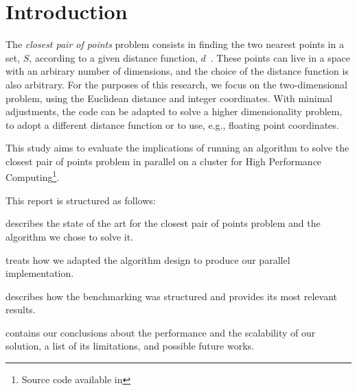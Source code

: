 \section{Introduction}
\label{sec:introduction}

The \textit{closest pair of points} problem consists
in finding the two nearest points in a set, $S$, according to a given distance function, $d$~\cite{closest_pair_definition}.
These points can live in a space with an arbirary number of dimensions,
and the choice of the distance function is also arbitrary.
For the purposes of this research, we focus on the two-dimensional problem, using the Euclidean distance and integer coordinates.
With minimal adjustments, the code can be adapted to solve a higher dimensionality problem, to adopt a different distance function or to use, e.g., floating point coordinates.

This study aims to evaluate the implications of running an algorithm to solve the closest pair of points problem in parallel on a cluster for High Performance Computing\footnote{Source code available in }.

This report is structured as follows:
\begin{inlinelist}
    \item {} describes the state of the art for the closest pair of points problem and the algorithm we chose to solve it.
    \item {} treats how we adapted the algorithm design to produce our parallel implementation.
    \item {} describes how the benchmarking was structured and
    provides its most relevant results.
    \item {} contains our conclusions about the performance and the scalability of our solution, a list of its limitations, and possible future works.
\end{inlinelist}
